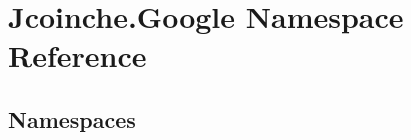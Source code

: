 \hypertarget{namespace_jcoinche_1_1_google}{}\section{Jcoinche.\+Google Namespace Reference}
\label{namespace_jcoinche_1_1_google}
\subsection*{Namespaces}
\begin{DoxyCompactItemize}
\end{DoxyCompactItemize}
